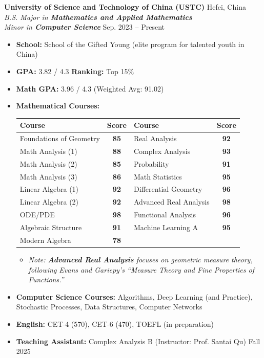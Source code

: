 \documentclass[11pt,a4paper]{article}
\begin{document}
\noindent \textbf{University of Science and Technology of China (USTC)} \hfill Hefei, China \\
\textit{B.S. Major in \textbf{Mathematics and Applied Mathematics}} \\
\textit{Minor in \textbf{Computer Science}} \hfill Sep. 2023 -- Present
\begin{itemize}[noitemsep, topsep=2pt, leftmargin=1.5em]
    \item \textbf{School:} School of the Gifted Young (elite program for talented youth in China)
    \item \textbf{GPA:} 3.82 / 4.3  \quad \textbf{Ranking:} Top 15\%
    \item \textbf{Math GPA:} 3.96 / 4.3 (Weighted Avg: 91.02)  
    \item \textbf{Mathematical Courses:}
    \vspace{0.2em}
    \begin{center}
    \begin{tabular}{|l|c|l|c|}
    \hline
    \textbf{Course} & \textbf{Score} & \textbf{Course} & \textbf{Score} \\
    \hline
    Foundations of Geometry & \textbf{85} & Real Analysis & \textbf{92} \\
    Math Analysis (1) & \textbf{88} & Complex Analysis & \textbf{93} \\
    Math Analysis (2) & \textbf{85} & Probability & \textbf{91} \\
    Math Analysis (3) & \textbf{86} & Math Statistics & \textbf{95} \\
    Linear Algebra (1) & \textbf{92} & Differential Geometry & \textbf{96} \\
    Linear Algebra (2) & \textbf{92} & Advanced Real Analysis & \textbf{98} \\
    ODE/PDE & \textbf{98} & Functional Analysis & \textbf{96} \\
    Algebraic Structure & \textbf{91} & Machine Learning A & \textbf{95} \\
    Modern Algebra & \textbf{78} & & \\
    \hline
    \end{tabular}
    \end{center}
    \vspace{-0.5em}
    \begin{itemize}[label=\small$\cdot$, leftmargin=2.5em, noitemsep, topsep=0pt]
        \item \textit{Note: \textbf{Advanced Real Analysis} focuses on geometric measure theory, following Evans and Gariepy's ``Measure Theory and Fine Properties of Functions.''}
    \end{itemize}
    \vspace{0.2em}
    \item \textbf{Computer Science Courses:} Algorithms, Deep Learning (and Practice), Stochastic Processes, Data Structures, Computer Networks
    \item \textbf{English:} CET-4 (570), CET-6 (470), TOEFL (in preparation)
    \item \textbf{Teaching Assistant:} Complex Analysis B (Instructor: Prof. Santai Qu) \hfill Fall 2025
\end{itemize}
\end{document}
